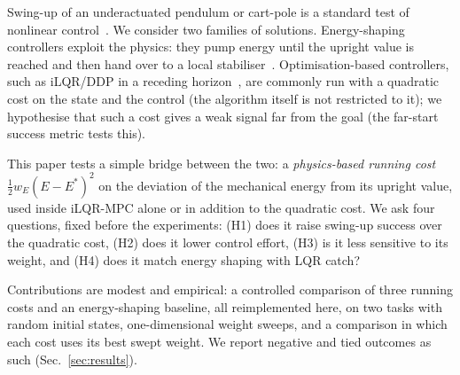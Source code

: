 Swing-up of an underactuated pendulum or cart-pole is a standard test of nonlinear control~\cite{boubaker2012inverted}. We consider two families of solutions. Energy-shaping controllers exploit the physics: they pump energy until the upright value is reached and then hand over to a local stabiliser~\cite{strm2000swinging}. Optimisation-based controllers, such as iLQR/DDP in a receding horizon~\cite{tassa2012synthesis}, are commonly run with a quadratic cost on the state and the control (the algorithm itself is not restricted to it); we hypothesise that such a cost gives a weak signal far from the goal (the far-start success metric tests this).

This paper tests a simple bridge between the two: a \emph{physics-based running cost} $\tfrac12 w_E (E-E^{*})^2$ on the deviation of the mechanical energy from its upright value, used inside iLQR-MPC alone or in addition to the quadratic cost. We ask four questions, fixed before the experiments: (H1) does it raise swing-up success over the quadratic cost, (H2) does it lower control effort, (H3) is it less sensitive to its weight, and (H4) does it match energy shaping with LQR catch?

Contributions are modest and empirical: a controlled comparison of three running costs and an energy-shaping baseline, all reimplemented here, on two tasks with random initial states, one-dimensional weight sweeps, and a comparison in which each cost uses its best swept weight. We report negative and tied outcomes as such (Sec.~\ref{sec:results}).
